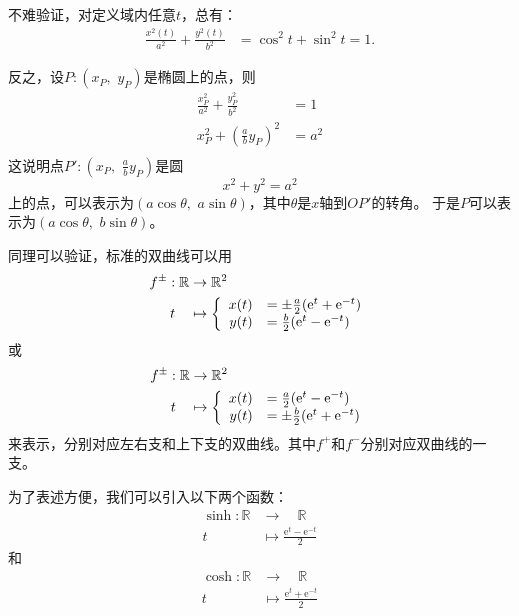 \documentclass[12pt,UTF8,fontset=none]{ctexbook}
\begin{document}
不难验证，对定义域内任意$t$，总有：
\begin{align*}
    \frac{x^2(t)}{a^2} + \frac{y^2(t)}{b^2} &= \cos^2{t} + \sin^2{t} = 1.
\end{align*}

反之，设$P:(x_P,\,\,y_P)$是椭圆上的点，则
\begin{align*}
    \frac{x_P^2}{a^2} + \frac{y_P^2}{b^2} &= 1\\
   x_P^2 + \left(\frac{a}{b}y_P\right)^2 & = a^2 \\
\end{align*}
这说明点$\displaystyle P': \left(x_P,\,\,\frac{a}{b}y_P\right)$是圆
$$ x^2 + y^2 = a^2$$
上的点，可以表示为$(a\cos{\theta},\,\,a\sin{\theta})$，其中$\theta$是$x$轴到$OP'$的转角。
于是$P$可以表示为$(a\cos{\theta},\,\,b\sin{\theta})$。

同理可以验证，标准的双曲线可以用
\begin{align*}
    f^{\pm}: \mathbb{R} &\rightarrow \mathbb{R}^2 \\
    t\quad &\mapsto\left\{
        \begin{array}[]{rl}
            x(t) &= \pm\frac{a}{2}(\mathrm{e}^t + \mathrm{e}^{-t}) \\
            y(t) &= \frac{b}{2}(\mathrm{e}^t - \mathrm{e}^{-t}) \\
        \end{array}
    \right.
\end{align*}
或
\begin{align*}
    f^{\pm}: \mathbb{R} &\rightarrow \mathbb{R}^2 \\
    t\quad &\mapsto\left\{
        \begin{array}[]{rl}
            x(t) &= \frac{a}{2}(\mathrm{e}^t - \mathrm{e}^{-t}) \\
            y(t) &= \pm\frac{b}{2}(\mathrm{e}^t + \mathrm{e}^{-t}) \\
        \end{array}
    \right.
\end{align*}
来表示，分别对应左右支和上下支的双曲线。其中$f^+$和$f^-$分别对应双曲线的一支。

为了表述方便，我们可以引入以下两个函数：
\begin{align*}
    \sinh: \mathbb{R} &\rightarrow \quad \mathbb{R} \\
    t\; &\mapsto \frac{\mathrm{e}^t - \mathrm{e}^{-t}}{2} 
\end{align*}
和
\begin{align*}
    \cosh: \mathbb{R} &\rightarrow \quad \mathbb{R} \\
    t\; &\mapsto \frac{\mathrm{e}^t + \mathrm{e}^{-t}}{2} 
\end{align*}
\end{document}
